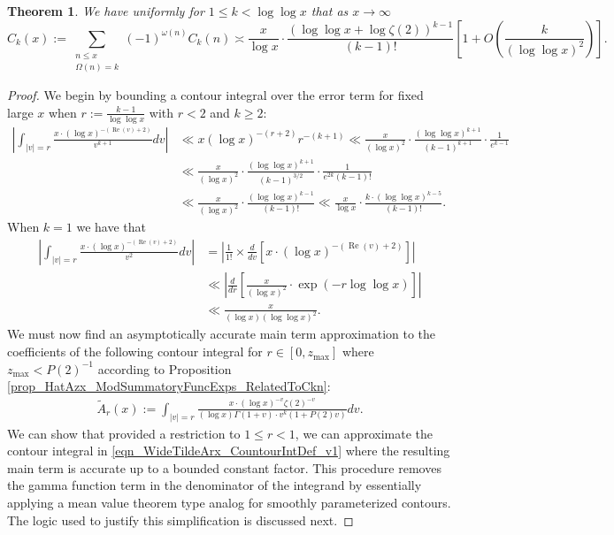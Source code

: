 \documentclass[11pt,reqno,a4letter]{article}
\numberwithin{figure}{section}
\numberwithin{table}{section}
\theoremstyle{plain}
\newtheorem{theorem}{Theorem}
\numberwithin{theorem}{section}
\theoremstyle{definition}
\renewcommand{\Re}{\operatorname{Re}}
\begin{document}
\begin{theorem} 
\label{theorem_CnkSpCasesScaledSummatoryFuncs} 
We have uniformly for $1 \leq k < \log\log x$ 
that as $x \rightarrow \infty$ 
\[
\widehat{C}_k(x) := 
     \sum_{\substack{n \leq x \\ \Omega(n) = k}} (-1)^{\omega(n)} 
     C_k(n) \asymp 
     \frac{x}{\log x} \cdot \frac{(\log\log x + \log\zeta(2))^{k-1}}{(k-1)!} \left[1 + 
     O\left(\frac{k}{(\log\log x)^2}\right)\right]. 
\]
\end{theorem} 
\begin{proof} 
We begin by bounding a contour integral over the error term for fixed large $x$ when 
$r := \frac{k-1}{\log\log x}$ with $r < 2$ and $k \geq 2$: 
\begin{align*} 
\left\lvert \int_{|v|=r} \frac{x \cdot (\log x)^{-(\Re(v) + 2)}}{v^{k+1}} dv \right\rvert & \ll 
     x (\log x)^{-(r+2)} r^{-(k+1)} \ll \frac{x}{(\log x)^2} \cdot 
     \frac{(\log\log x)^{k+1}}{(k-1)^{k+1}} \cdot \frac{1}{e^{k-1}} \\ 
     & \ll \frac{x}{(\log x)^2} \cdot \frac{(\log\log x)^{k+1}}{(k-1)^{3/2}} \cdot 
     \frac{1}{e^{2k} (k-1)!} \\ 
     & \ll \frac{x}{(\log x)^2} \cdot \frac{(\log\log x)^{k-1}}{(k-1)!} \ll 
     \frac{x}{\log x} \cdot \frac{k \cdot (\log\log x)^{k-5}}{(k-1)!}. 
\end{align*} 
When $k = 1$ we have that 
\begin{align*} 
\left\lvert \int_{|v|=r} \frac{x \cdot (\log x)^{-(\Re(v) + 2)}}{v^{2}} dv \right\rvert & = 
     \left\lvert \frac{1}{1!} \times \frac{d}{dv}\left[x \cdot (\log x)^{-(\Re(v) + 2)}\right] \right\rvert \\ 
     & \ll \left\lvert \frac{d}{dr}\left[\frac{x}{(\log x)^2} \cdot \exp(-r \log\log x)\right] \right\rvert \\ 
     & \ll \frac{x}{(\log x)(\log\log x)^2}. 
\end{align*} 
We must now find an asymptotically accurate main term approximation to the coefficients 
of the following contour integral for $r \in [0, z_{\max}]$ where $z_{\max} < P(2)^{-1}$ 
according to Proposition \ref{prop_HatAzx_ModSummatoryFuncExps_RelatedToCkn}: 
\begin{align} 
\label{eqn_WideTildeArx_CountourIntDef_v1} 
\widetilde{A}_r(x) := 
     \int_{|v|=r} \frac{x \cdot (\log x)^{-v} \zeta(2)^{-v}}{(\log x) \Gamma(1+v) \cdot 
     v^{k} (1 + P(2) v)} dv. 
\end{align} 
We can show that provided a restriction to 
$1 \leq r < 1$, we can approximate the contour integral in 
\eqref{eqn_WideTildeArx_CountourIntDef_v1} where 
the resulting main term is accurate up to a bounded constant factor. 
This procedure removes the 
gamma function term in the denominator of the integrand by essentially applying 
a mean value theorem type analog for smoothly 
parameterized contours. The logic used to justify this 
simplification is discussed next. 


\end{proof}
\end{document}
